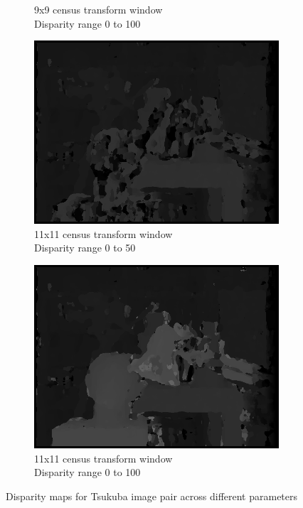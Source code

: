 \begin{figure}
\begin{subfigure}{.5\textwidth}
  \caption{9x9 census transform window \\Disparity range 0 to 100}
  \label{fig:sfig6}
\end{subfigure}
\begin{subfigure}{.5\textwidth}
  \centering
  \includegraphics[width=.8\linewidth]{figures/CT11D0-50}
  \caption{11x11 census transform window \\Disparity range 0 to 50}
  \label{fig:sfig7}
\end{subfigure}%
\begin{subfigure}{.5\textwidth}
  \centering
  \includegraphics[width=.8\linewidth]{figures/CT11D0-100}
  \caption{11x11 census transform window \\Disparity range 0 to 100}
  \label{fig:sfig8}
\end{subfigure}
\caption{Disparity maps for Tsukuba image pair across different parameters}
\label{fig:dmappartsu}
\end{figure}


